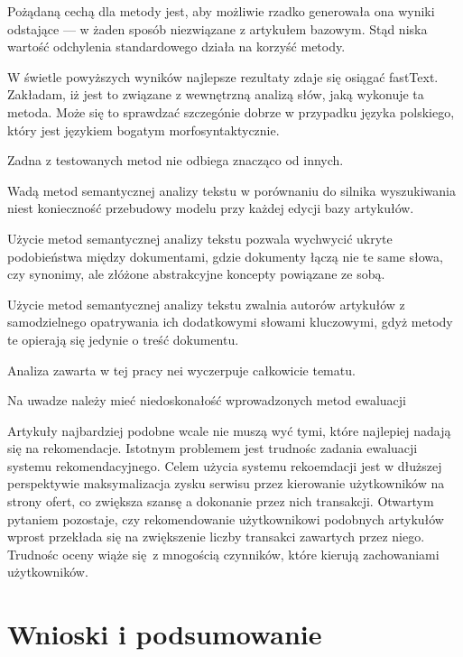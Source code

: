 \documentclass[pl]{minipw} %
\begin{document}
Pożądaną cechą dla metody jest, aby możliwie rzadko generowała ona wyniki odstające --- w żaden sposób niezwiązane z artykułem bazowym. Stąd niska wartość odchylenia standardowego działa na korzyść metody.

W świetle powyższych wyników najlepsze rezultaty zdaje się osiągać fastText. Zakładam, iż jest to związane z wewnętrzną analizą słów, jaką wykonuje ta metoda. Może się to sprawdzać szczegónie dobrze w przypadku języka polskiego, który jest językiem bogatym morfosyntaktycznie.

Zadna z testowanych metod nie odbiega znacząco od innych.

Wadą metod semantycznej analizy tekstu w porównaniu do silnika wyszukiwania niest konieczność przebudowy modelu przy każdej edycji bazy artykułów.

Użycie metod semantycznej analizy tekstu pozwala wychwycić ukryte podobieństwa między dokumentami, gdzie dokumenty łączą nie te same słowa, czy synonimy, ale złóżone abstrakcyjne koncepty powiązane ze sobą.

Użycie metod semantycznej analizy tekstu zwalnia autorów artykułów z samodzielnego opatrywania ich dodatkowymi słowami kluczowymi, gdyż metody te opierają się jedynie o treść dokumentu.

Analiza zawarta w tej pracy nei wyczerpuje całkowicie tematu. 

Na uwadze należy mieć niedoskonałość wprowadzonych metod ewaluacji

Artykuły najbardziej podobne wcale nie muszą wyć tymi, które najlepiej nadają się na rekomendacje. Istotnym problemem jest trudnośc zadania ewaluacji systemu rekomendacyjnego. Celem użycia systemu rekoemdacji jest w dłuższej perspektywie maksymalizacja zysku serwisu przez kierowanie użytkowników na strony ofert, co zwiększa szansę a dokonanie przez nich transakcji. Otwartym pytaniem pozostaje, czy rekomendowanie użytkownikowi podobnych artykułów wprost przekłada się na zwiększenie liczby transakci zawartych przez niego. Trudnośc oceny wiąże się z mnogością czynników, które kierują zachowaniami użytkowników.




\chapter{Wnioski i podsumowanie}

\end{document}
